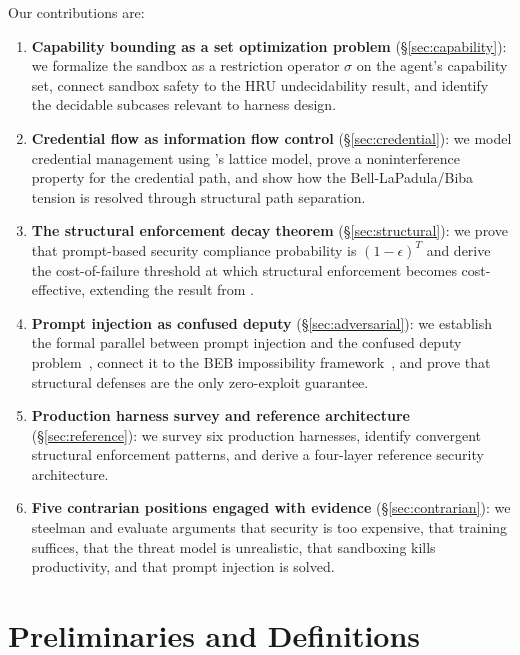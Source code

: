 \documentclass[11pt, a4paper, copyright]{googledeepmind}
\begin{document}
Our contributions are:

\begin{enumerate}
    \item \textbf{Capability bounding as a set optimization problem} (\S\ref{sec:capability}): we formalize the sandbox as a restriction operator $\sigma$ on the agent's capability set, connect sandbox safety to the HRU undecidability result, and identify the decidable subcases relevant to harness design.

    \item \textbf{Credential flow as information flow control} (\S\ref{sec:credential}): we model credential management using \citeauthor{denning1976lattice}'s lattice model, prove a noninterference property for the credential path, and show how the Bell-LaPadula/Biba tension is resolved through structural path separation.

    \item \textbf{The structural enforcement decay theorem} (\S\ref{sec:structural}): we prove that prompt-based security compliance probability is $(1-\epsilon)^T$ and derive the cost-of-failure threshold at which structural enforcement becomes cost-effective, extending the result from \citet{pillar-reliability}.

    \item \textbf{Prompt injection as confused deputy} (\S\ref{sec:adversarial}): we establish the formal parallel between prompt injection and the confused deputy problem~\citep{hardy1988confused}, connect it to the BEB impossibility framework~\citep{wolf2024fundamental}, and prove that structural defenses are the only zero-exploit guarantee.

    \item \textbf{Production harness survey and reference architecture} (\S\ref{sec:reference}): we survey six production harnesses, identify convergent structural enforcement patterns, and derive a four-layer reference security architecture.

    \item \textbf{Five contrarian positions engaged with evidence} (\S\ref{sec:contrarian}): we steelman and evaluate arguments that security is too expensive, that training suffices, that the threat model is unrealistic, that sandboxing kills productivity, and that prompt injection is solved.
\end{enumerate}


\section{Preliminaries and Definitions}
\label{sec:prelim}
\end{document}
